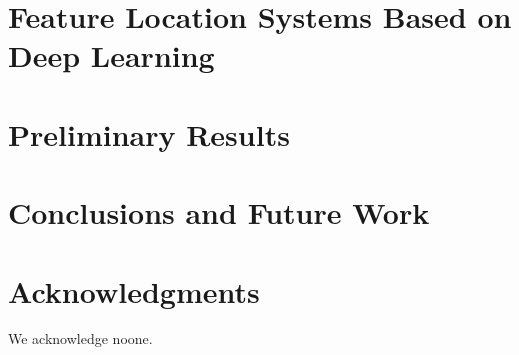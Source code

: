 \documentclass[conference]{IEEEtran}
\begin{document}
\section{Feature Location Systems Based on Deep Learning}\label{design}


\section{Preliminary Results}\label{results}


\section{Conclusions and Future Work}\label{futurework}


\section*{Acknowledgments}
We acknowledge noone.



\end{document}
